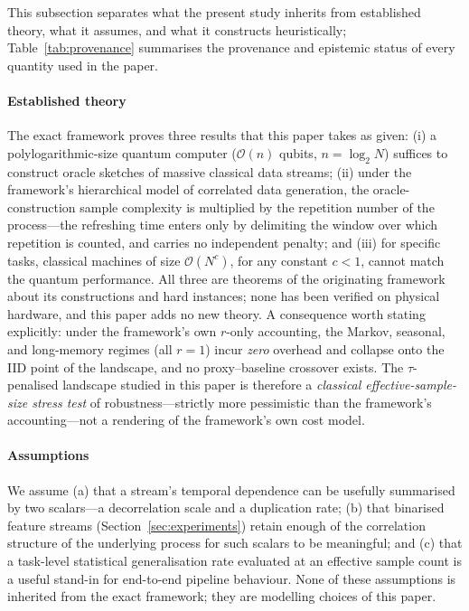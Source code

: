 \documentclass[sensors,article,submit,pdftex,moreauthors]{Definitions/mdpi}
\newcommand{\bigO}{\mathcal{O}}
\providecommand{\DIFadd}[1]{{\protect\color{blue}#1}} %
\begin{document}
\DIFadd{This subsection separates what the present study inherits from established theory, what it assumes, and what it constructs heuristically; Table~\ref{tab:provenance} summarises the provenance and epistemic status of every quantity used in the paper.
}

\paragraph{\DIFadd{Established theory}} \DIFadd{The exact framework }\citep{zhao2026exponential} \DIFadd{proves three results that this paper takes as given: (i) a polylogarithmic-size quantum computer ($\bigO(n)$ qubits, $n = \log_2 N$) suffices to construct oracle sketches of massive classical data streams; (ii) under the framework's hierarchical model of correlated data generation, the oracle-construction sample complexity is multiplied by the repetition number of the process---the refreshing time enters only by delimiting the window over which repetition is counted, and carries no independent penalty; and (iii) for specific tasks, classical machines of size $\bigO(N^{c})$, for any constant $c < 1$, cannot match the quantum performance. All three are theorems of the originating framework about its constructions and hard instances; none has been verified on physical hardware, and this paper adds no new theory. A consequence worth stating explicitly: under the framework's own $r$-only accounting, the Markov, seasonal, and long-memory regimes (all $r = 1$) incur }\emph{\DIFadd{zero}} \DIFadd{overhead and collapse onto the IID point of the landscape, and no proxy--baseline crossover exists. The $\tau$-penalised landscape studied in this paper is therefore a }\emph{\DIFadd{classical effective-sample-size stress test}} \DIFadd{of robustness---strictly more pessimistic than the framework's accounting---not a rendering of the framework's own cost model.
}

\paragraph{\DIFadd{Assumptions}} \DIFadd{We assume (a) that a stream's temporal dependence can be usefully summarised by two scalars---a decorrelation scale and a duplication rate; (b) that binarised feature streams (Section~\ref{sec:experiments}) retain enough of the correlation structure of the underlying process for such scalars to be meaningful; and (c) that a task-level statistical generalisation rate evaluated at an effective sample count is a useful stand-in for end-to-end pipeline behaviour. None of these assumptions is inherited from the exact framework; they are modelling choices of this paper.
}
\end{document}
